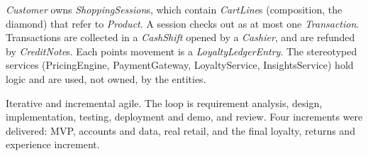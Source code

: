 \documentclass[10pt,a4paper]{article}
\begin{document}
\begin{description}[leftmargin=*,style=nextline,itemsep=2pt]
  \item[Figure 2.8: Class diagram] \emph{Customer} owns \emph{ShoppingSession}s, which contain \emph{CartLine}s (composition, the diamond) that refer to \emph{Product}. A session checks out as at most one \emph{Transaction}. Transactions are collected in a \emph{CashShift} opened by a \emph{Cashier}, and are refunded by \emph{CreditNote}s. Each points movement is a \emph{LoyaltyLedgerEntry}. The stereotyped services (PricingEngine, PaymentGateway, LoyaltyService, InsightsService) hold logic and are used, not owned, by the entities.
  \item[Figure 2.2: SDLC] Iterative and incremental agile. The loop is requirement analysis, design, implementation, testing, deployment and demo, and review. Four increments were delivered: MVP, accounts and data, real retail, and the final loyalty, returns and experience increment.
\end{description}
\end{document}
